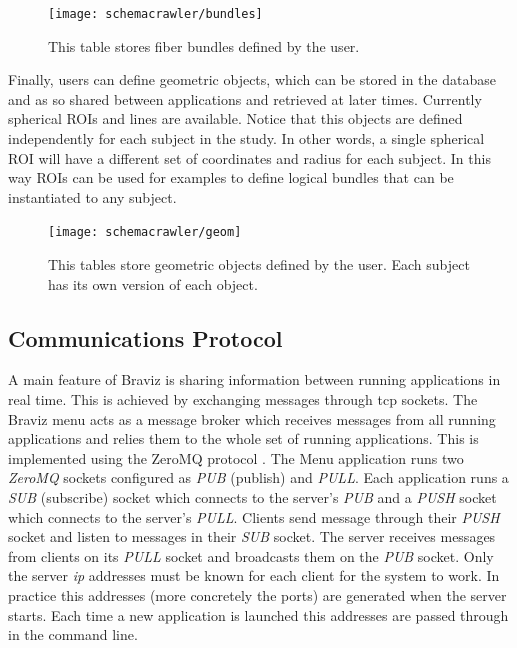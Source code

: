 \begin{figure}
\centering
\texttt{[image: schemacrawler/bundles]}%
\caption{\label{fig_db_bundles} This table stores fiber bundles defined by the user.}
\end{figure}

Finally, users can define geometric objects, which can be stored in the database and as so shared between applications and retrieved at later times. Currently spherical ROIs and lines are available. Notice that this objects are defined independently for each subject in the study. In other words, a single spherical ROI will have a different set of coordinates and radius for each subject. In this way ROIs can be used for examples to define logical bundles that can be instantiated to any subject.

\begin{figure}
\centering
\texttt{[image: schemacrawler/geom]}%
\caption{\label{fig_db_geom} This tables store geometric objects defined by the user. Each subject has its own version of each object.}
\end{figure}

\subsection{Communications Protocol}

A main feature of Braviz is sharing information between running applications in real time. This is achieved by exchanging messages through tcp sockets. The Braviz menu acts as a message broker which receives messages from all running applications and relies them to the whole set of running applications. This is implemented using the ZeroMQ protocol \autocite{hintjens_zeromq:_2013}. The Menu application runs  two \emph{ZeroMQ} sockets configured as \emph{PUB} (publish) and \emph{PULL}. Each application runs a \emph{SUB} (subscribe) socket which connects to the server's \emph{PUB} and a \emph{PUSH} socket which connects to the server's \emph{PULL}. Clients send message through their \emph{PUSH} socket and listen to messages in their \emph{SUB} socket. The server receives messages from clients on its \emph{PULL} socket and broadcasts them on the \emph{PUB} socket. Only the server \emph{ip} addresses must be known for each client for the system to work. In practice this addresses (more concretely the ports) are generated when the server starts. Each time a new application is launched this addresses are passed through in the command line.

